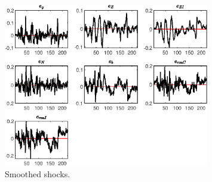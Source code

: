  
\begin{figure}[H]
\centering 
\includegraphics[width=0.80\textwidth]{BRS_sectoral_wo_demand_shocks/graphs/BRS_sectoral_wo_demand_shocks_SmoothedShocks1}
\caption{Smoothed shocks.}\label{Fig:SmoothedShocks:1}
\end{figure}


